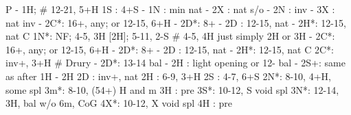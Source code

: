 P - 1H;  # 12-21, 5+H
1S : 4+S
   - 1N : min nat
        - 2X : nat s/o
        - 2N : inv
        - 3X : nat inv
   - 2C*: 16+, any; or 12-15, 6+H
        - 2D*: 8+
   - 2D : 12-15, nat
   - 2H*: 12-15, nat C
1N*: NF; 4-5, 3H [2H]; 5-11, 2-S  # 4-5, 4H just simply 2H or 3H
   - 2C*: 16+, any; or 12-15, 6+H
        - 2D*: 8+
   - 2D : 12-15, nat
   - 2H*: 12-15, nat C
2C*: inv+, 3+H  # Drury
   - 2D*: 13-14 bal
   - 2H : light opening or 12- bal
   - 2S+: same as after 1H - 2H
2D : inv+, nat
2H : 6-9, 3+H
2S : 4-7, 6+S
2N*: 8-10, 4+H, some spl
3m*: 8-10, (54+) H and m
3H : pre
3S*: 10-12, S void spl
3N*: 12-14, 3H, bal w/o 6m, CoG
4X*: 10-12, X void spl
4H : pre